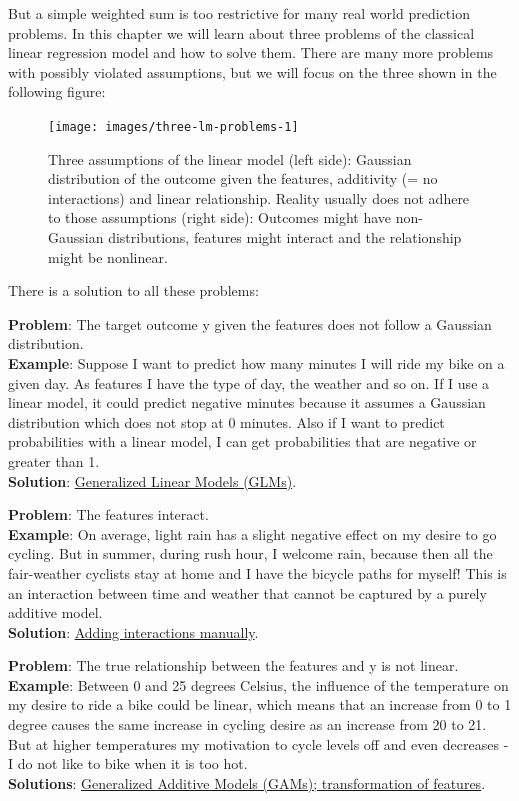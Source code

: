\documentclass[
  12pt,
]{krantz}
\begin{document}
But a simple weighted sum is too restrictive for many real world prediction problems.
In this chapter we will learn about three problems of the classical linear regression model and how to solve them.
There are many more problems with possibly violated assumptions, but we will focus on the three shown in the following figure:

\begin{figure}

{\centering \texttt{[image: images/three-lm-problems-1]} 

}

\caption{Three assumptions of the linear model (left side): Gaussian distribution of the outcome given the features, additivity (= no interactions) and linear relationship. Reality usually does not adhere to those assumptions (right side): Outcomes might have non-Gaussian distributions, features might interact and the relationship might be nonlinear.}\label{fig:three-lm-problems}
\end{figure}

There is a solution to all these problems:

\textbf{Problem}: The target outcome y given the features does not follow a Gaussian distribution.\\
\textbf{Example}: Suppose I want to predict how many minutes I will ride my bike on a given day.
As features I have the type of day, the weather and so on.
If I use a linear model, it could predict negative minutes because it assumes a Gaussian distribution which does not stop at 0 minutes.
Also if I want to predict probabilities with a linear model, I can get probabilities that are negative or greater than 1.\\
\textbf{Solution}: \protect\hyperlink{glm}{Generalized Linear Models (GLMs)}.

\textbf{Problem}: The features interact.\\
\textbf{Example}: On average, light rain has a slight negative effect on my desire to go cycling.
But in summer, during rush hour, I welcome rain, because then all the fair-weather cyclists stay at home and I have the bicycle paths for myself!
This is an interaction between time and weather that cannot be captured by a purely additive model.\\
\textbf{Solution}: \protect\hyperlink{lm-interact}{Adding interactions manually}.

\textbf{Problem}: The true relationship between the features and y is not linear.\\
\textbf{Example}: Between 0 and 25 degrees Celsius, the influence of the temperature on my desire to ride a bike could be linear, which means that an increase from 0 to 1 degree causes the same increase in cycling desire as an increase from 20 to 21.
But at higher temperatures my motivation to cycle levels off and even decreases - I do not like to bike when it is too hot.\\
\textbf{Solutions}: \protect\hyperlink{gam}{Generalized Additive Models (GAMs); transformation of features}.
\end{document}

